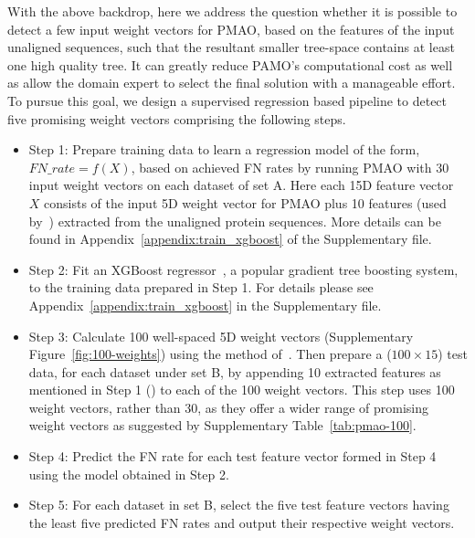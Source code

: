 With the above backdrop, here we address the question whether it is possible to detect a few input weight vectors for PMAO, based on the features of the input unaligned sequences, such that the resultant smaller tree-space contains at least one high quality tree. It can greatly reduce PAMO's computational cost as well as allow the domain expert to select the final solution with a manageable effort. To pursue this goal, we design a supervised regression based pipeline to detect five promising weight vectors comprising the following steps.
\begin{itemize}
	\item Step 1: Prepare training data to learn a regression model of the form, $FN\_rate = f(X)$, based on achieved FN rates by running PMAO with 30 input weight vectors on each dataset of set A. Here each 15D feature vector $X$ consists of the input 5D weight vector for PMAO plus 10 features (used by~\cite{rubio2018characteristic}) extracted from the unaligned protein sequences. More details can be found in Appendix~\ref{appendix:train_xgboost} of the Supplementary file.  
	\item Step 2: Fit an XGBoost regressor~\cite{chen2016xgboost}, a popular gradient tree boosting system, to the training data prepared in Step 1. For details please see Appendix~\ref{appendix:train_xgboost} in the Supplementary file. 
	\item Step 3: Calculate 100 well-spaced 5D weight vectors (Supplementary Figure~\ref{fig:100-weights}) using the method of~\cite{ref_dirs_energy}. Then prepare a ($100 \times 15$) test data, for each dataset under set B, by appending 10 extracted features as mentioned in Step 1 (\cite{rubio2018characteristic}) to each of the 100 weight vectors. This step uses 100 weight vectors, rather than 30, as they offer a wider range of promising weight vectors as suggested by Supplementary Table~\ref{tab:pmao-100}.
	\item Step 4: Predict the FN rate for each test feature vector formed in Step 4 using the model obtained in Step 2. 
	\item Step 5: For each dataset in set B, select the five test feature vectors having the least five predicted FN rates and output their respective weight vectors.
\end{itemize}

